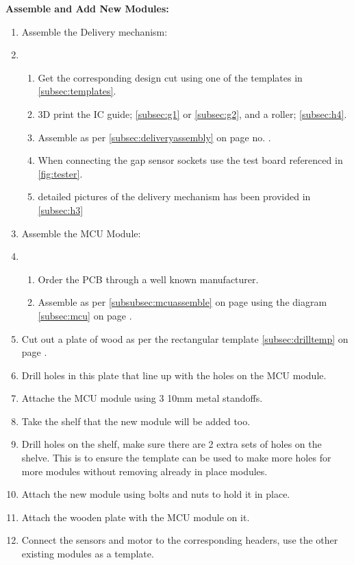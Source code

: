 \documentclass[a4paper,11pt]{article}
\numberwithin{figure}{section}
\numberwithin{table}{section}
\begin{document}
\begin{appendices}
\textbf{Assemble and Add New Modules:}
\begin{enumerate}
\item Assemble the Delivery mechanism:
\item \begin{enumerate}
		\item Get the corresponding design cut using one of the templates in \autoref{subsec:templates}.
		\item 3D print the IC guide; \autoref{subsec:g1} or \autoref{subsec:g2}, and a roller; \autoref{subsec:h4}.
		\item Assemble as per \autoref{subsec:deliveryassembly} on page no. \pageref{subsec:deliveryassembly}.
		\item When connecting the gap sensor sockets use the test board referenced in \autoref{fig:tester}.
		\item detailed pictures of the delivery mechanism has been provided in \autoref{subsec:h3}
		\end{enumerate}
\item Assemble the MCU Module:
\item \begin{enumerate}
		\item Order the PCB through a well known manufacturer.
		\item Assemble as per \autoref{subsubsec:mcuassemble} on page \pageref{subsubsec:mcuassemble} using the diagram \autoref{subsec:mcu} on page \pageref{subsec:mcu}.
		\end{enumerate}
\item Cut out a plate of wood as per the rectangular template \autoref{subsec:drilltemp} on page \pageref{subsec:drilltemp}.
\item Drill holes in this plate that line up with the holes on the MCU module.
\item Attache the MCU module using 3 10mm metal standoffs.
\item Take the shelf that the new module will be added too.
\item Drill holes on the shelf, make sure there are 2 extra sets of holes on the shelve. This is to ensure the template can be used to make more holes for more modules without removing already in place modules.
\item Attach the new module using bolts and nuts to hold it in place.
\item Attach the wooden plate with the MCU module on it.
\item Connect the sensors and motor to the corresponding headers, use the other existing modules as a template.
\end{enumerate}


\end{appendices}
\end{document}
